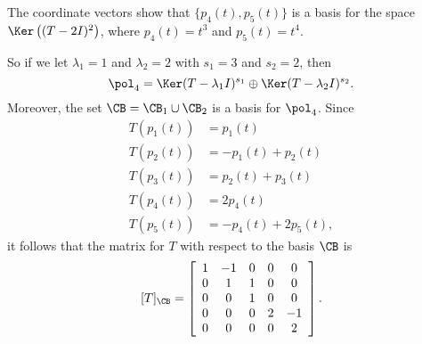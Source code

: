 \item The coordinate vectors show that $\{p_4(t), p_5(t)\}$ is a basis for the space $\Ker\left((T-2I)^2\right)$, where $p_4(t) = t^3$ and $p_5(t) = t^4$.  

\item So if we let $\lambda_1 = 1$ and $\lambda_2 = 2$ with $s_1=3$ and $s_2 = 2$, then 
\[\pol_4 = \Ker(T-\lambda_1 I)^{s_1} \oplus \Ker(T-\lambda_2 I)^{s_2}.\]
Moreover, the set $\CB = \CB_1 \cup \CB_2$ is a basis for $\pol_4$. Since 
\begin{align*}
T(p_1(t)) &= p_1(t) \\
T(p_2(t)) &= -p_1(t)+p_2(t) \\
T(p_3(t)) &= p_2(t)+p_3(t) \\
T(p_4(t)) &= 2p_4(t) \\
T(p_5(t)) &= -p_4(t)+2p_5(t),
\end{align*}
it follows that the matrix for $T$ with respect to the basis $\CB$ is 
\[[T]_{\CB} = \left[ \begin{array}{ccccc} 1&-1&0&0&0 \\ 0&1&1&0&0 \\ 0&0&1&0&0 \\ 0&0&0&2&-1 \\ 0&0&0&0&2 \end{array} \right].\]

\ea


